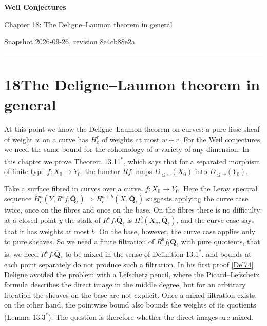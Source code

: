 \documentclass[11pt]{article}
\newcommand{\bpout}[1]{#1\textsuperscript{\hyperlink{bp-outside}{\ensuremath{\ast}}}}
\begin{document}
\pagestyle{plain}
\begin{center}
{\LARGE\bfseries Weil Conjectures\par}
\vspace{0.7em}
{\large Chapter 18: The Deligne–Laumon theorem in general\par}
\vspace{0.5em}
{\small\color{bpmuted}Snapshot 2026-09-26, revision 8e4cb88e2a\par}
\end{center}
\vspace{0.5em}
{\small\tableofcontents}
\bigskip\hrule\bigskip

\section*{\texorpdfstring{18\quad The Deligne–Laumon theorem in general}{18 The Deligne–Laumon theorem in general}}
\label{bp1}%
\label{bp2}%
At this point we know the Deligne–Laumon theorem on curves: a pure lisse sheaf of weight \(w\) on a curve has \(H^r_c\) of weights at most \(w+r\). For the Weil conjectures we need the same bound for the cohomology of a variety of any dimension. In this chapter we prove Theorem \bpout{13.11}, which says that for a separated morphism of finite type \(f:X_0\to Y_0\), the functor \(Rf_!\) maps \(D_{\leq w}(X_0)\) into \(D_{\leq w}(Y_0)\).

Take a surface fibred in curves over a curve, \(f:X_0\to Y_0\). Here the Leray spectral sequence \(H^a_c(Y,R^bf_!\overline{\mathbf Q}_\ell)\Rightarrow H^{a+b}_c(X,\overline{\mathbf Q}_\ell)\) suggests applying the curve case twice, once on the fibres and once on the base. On the fibres there is no difficulty: at a closed point \(y\) the stalk of \(R^bf_!\overline{\mathbf Q}_\ell\) is \(H^b_c(X_{\bar y},\overline{\mathbf Q}_\ell)\), and the curve case says that it has weights at most \(b\). On the base, however, the curve case applies only to pure sheaves. So we need a finite filtration of \(R^bf_!\overline{\mathbf Q}_\ell\) with pure quotients, that is, we need \(R^bf_!\overline{\mathbf Q}_\ell\) to be mixed in the sense of Definition \bpout{13.1}, and bounds at each point separately do not produce such a filtration. In his first proof [\hyperref[bp49]{Del74}] Deligne avoided the problem with a Lefschetz pencil, where the Picard–Lefschetz formula describes the direct image in the middle degree, but for an arbitrary fibration the sheaves on the base are not explicit. Once a mixed filtration exists, on the other hand, the pointwise bound also bounds the weights of its quotients (Lemma \bpout{13.3}). The question is therefore whether the direct images are mixed.
\end{document}
